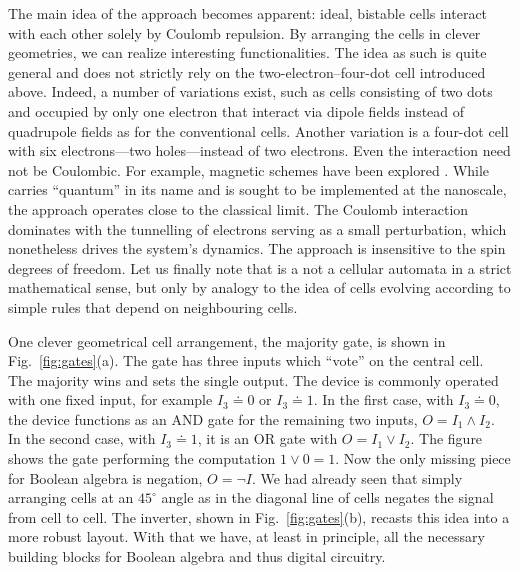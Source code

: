 The main idea of the  approach becomes apparent: ideal, bistable cells
interact with each other solely by Coulomb repulsion. By arranging the cells in
clever geometries, we can realize interesting functionalities. The idea as such
is quite general and does not strictly rely on the two-electron--four-dot cell
introduced above. Indeed, a number of variations exist, such as cells consisting
of two dots and occupied by only one electron that interact via dipole fields
instead of quadrupole fields as for the conventional cells. Another variation is
a four-dot cell with six electrons---two holes---instead of two electrons. Even
the interaction need not be Coulombic. For example, magnetic  schemes
have been explored \cite{bernstein2005magnetic}. While  carries
``quantum'' in its name and is sought to be implemented at the nanoscale, the
approach operates close to the classical limit. The Coulomb interaction
dominates with the tunnelling of electrons serving as a small perturbation,
which nonetheless drives the system's dynamics. The approach is insensitive to
the spin degrees of freedom. Let us finally note that  is a not a
cellular automata in a strict mathematical sense, but only by analogy to the
idea of cells evolving according to simple rules that depend on neighbouring
cells.

One clever geometrical cell arrangement, the majority gate, is shown in
Fig.~\ref{fig:gates}(a). The gate has three inputs which ``vote'' on the central
cell. The majority wins and sets the single output. The device is commonly
operated with one fixed input, for example $I_3 \doteq 0$ or $I_3 \doteq 1$. In
the first case, with $I_3 \doteq 0$, the device functions as an AND gate for the
remaining two inputs, $O = I_1 \land I_2$. In the second case, with $I_3 \doteq
1$, it is an OR gate with $O = I_1 \lor I_2$. The figure shows the gate
performing the computation $1 \lor 0 = 1$. Now the only missing piece for
Boolean algebra is negation, $O = \lnot I$. We had already seen that simply
arranging cells at an $45^{\circ}$ angle as in the diagonal line of cells
negates the signal from cell to cell. The inverter, shown in
Fig.~\ref{fig:gates}(b), recasts this idea into a more robust layout. With that
we have, at least in principle, all the necessary building blocks for Boolean
algebra and thus digital circuitry.

